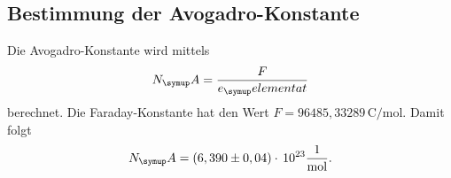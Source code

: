 \subsection{Bestimmung der Avogadro-Konstante}
Die Avogadro-Konstante wird mittels
\begin{equation}
  N_\su{A} = \frac{F}{e_\su{elementat}}
\end{equation}
berechnet. Die Faraday-Konstante hat den Wert $F=96485,33289\,\si{\coulomb\per\mol}$.
Damit folgt
\begin{equation}
  N_\su{A} = (6,390\pm0,04)\cdot\,10^{23}\si[per-mode=fraction]{\per\mol}.
\end{equation}
